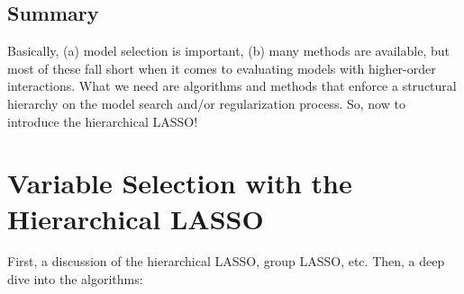\subsection{Summary}
Basically, (a) model selection is important, (b) many methods are available, but most of these fall short when it comes to evaluating models with higher-order interactions. What we need are algorithms and methods that enforce a structural hierarchy on the model search and/or regularization process. So, now to introduce the hierarchical LASSO!

\section{Variable Selection with the Hierarchical LASSO}
First, a discussion of the hierarchical LASSO, group LASSO, etc. Then, a deep dive into the algorithms:
